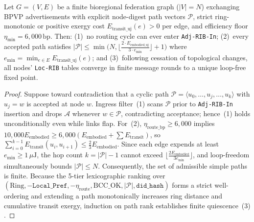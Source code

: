 \begin{theorem}
\label{thm:ch5-bpvp-convergence}
Let $G = (V, E)$ be a finite bioregional federation graph ($|V| = N$) exchanging BPVP advertisements
with explicit node-digest path vectors $\mathcal{P}$, strict ring-monotonic or positive exergy
cost $E_{\mathrm{transit\_uj}}(e) > 0$ per edge, and efficiency floor $\eta_{\min} = 6{,}000\,\mathrm{bp}$.
Then: (1)~no routing cycle can ever enter \texttt{Adj-RIB-In}; (2)~every accepted path satisfies
$|\mathcal{P}| \le \min\bigl(N, \lfloor \frac{2 \cdot E_{\mathrm{embodied\_uj}}}{3 \cdot e_{\min}} \rfloor + 1\bigr)$
where $e_{\min} = \min_{e \in E} E_{\mathrm{transit\_uj}}(e)$; and (3)~following cessation of
topological changes, all nodes' \texttt{Loc-RIB} tables converge in finite message rounds to a
unique loop-free fixed point.
\end{theorem}
\begin{proof}
Suppose toward contradiction that a cyclic path $\mathcal{P} = \langle u_0, \dots, u_j, \dots, u_k \rangle$
with $u_j = w$ is accepted at node $w$. Ingress filter~(1) scans $\mathcal{P}$ prior to
\texttt{Adj-RIB-In} insertion and drops $\mathcal{A}$ whenever $w \in \mathcal{P}$, contradicting
acceptance; hence~(1) holds unconditionally even while links flap. For~(2), $\eta_{\mathrm{route\_bp}} \ge 6{,}000$
implies $10{,}000 E_{\mathrm{embodied}} \ge 6{,}000 (E_{\mathrm{embodied}} + \sum E_{\mathrm{transit}})$,
so $\sum_{i=0}^{k-1} E_{\mathrm{transit}}(u_i, u_{i+1}) \le \frac{2}{3} E_{\mathrm{embodied}}$. Since
each edge expends at least $e_{\min} \ge 1\,\mu\mathrm{J}$, the hop count $k = |\mathcal{P}| - 1$
cannot exceed $\lfloor \frac{2 E_{\mathrm{embodied}}}{3 e_{\min}} \rfloor$, and loop-freedom
simultaneously bounds $|\mathcal{P}| \le N$. Consequently, the set of admissible simple paths is
finite. Because the 5-tier lexicographic ranking over $(\text{Ring}, -\mathtt{Local\_Pref},
-\eta_{\mathrm{route}}, \text{BCC\_OK}, |\mathcal{P}|, \mathtt{did\_hash})$ forms a strict well-ordering
and extending a path monotonically increases ring distance and cumulative transit exergy, induction
on path rank establishes finite quiescence~(3) \parencite{rekhter2006,dijkstra1959note}.
\end{proof}

